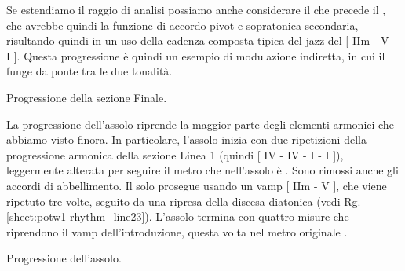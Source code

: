 \documentclass[class=book, crop=false, oneside, 12pt]{standalone}
\begin{document}
    Se estendiamo il raggio di analisi possiamo anche considerare il  che precede il , che avrebbe quindi la funzione di accordo pivot e sopratonica secondaria, risultando quindi in un uso della cadenza composta tipica del jazz del [ IIm - V - I ]. Questa progressione è quindi un esempio di modulazione indiretta, in cui il  funge da ponte tra le due tonalità.

    \begin{sheet}[htbp]
        \centering
        \caption{Progressione della sezione Finale.}
        \label{sheet:potw1-chords_line4}
    \end{sheet}
    
    La progressione dell'assolo riprende la maggior parte degli elementi armonici che abbiamo visto finora. In particolare, l'assolo inizia con due ripetizioni della progressione armonica della sezione Linea 1 (quindi [ IV - IV - I - I ]), leggermente alterata per seguire il metro che nell'assolo è . Sono rimossi anche gli accordi di abbellimento. Il solo prosegue usando un vamp [ IIm - V ], che viene ripetuto tre volte, seguito da una ripresa della discesa diatonica (vedi Rg.\ref{sheet:potw1-rhythm_line23}). L'assolo termina con quattro misure che riprendono il vamp dell'introduzione, questa volta nel metro originale .

    \begin{sheet}[htbp]
        \centering
        \caption{Progressione dell'assolo.}
        \label{sheet:potw-chords_solo}
    \end{sheet}
\end{document}
